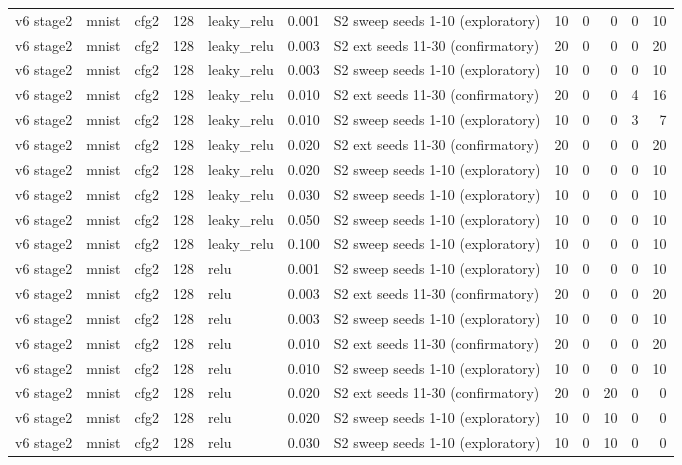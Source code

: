 \begin{table}[htbp]
{\begin{tabular}{@{}lllrlrlrrrrr@{}}
v6 stage2 & mnist & cfg2 & 128 & leaky\_relu & 0.001 & S2 sweep seeds 1-10 (exploratory) & 10 & 0 & 0 & 0 & 10 \\
v6 stage2 & mnist & cfg2 & 128 & leaky\_relu & 0.003 & S2 ext seeds 11-30 (confirmatory) & 20 & 0 & 0 & 0 & 20 \\
v6 stage2 & mnist & cfg2 & 128 & leaky\_relu & 0.003 & S2 sweep seeds 1-10 (exploratory) & 10 & 0 & 0 & 0 & 10 \\
v6 stage2 & mnist & cfg2 & 128 & leaky\_relu & 0.010 & S2 ext seeds 11-30 (confirmatory) & 20 & 0 & 0 & 4 & 16 \\
v6 stage2 & mnist & cfg2 & 128 & leaky\_relu & 0.010 & S2 sweep seeds 1-10 (exploratory) & 10 & 0 & 0 & 3 & 7 \\
v6 stage2 & mnist & cfg2 & 128 & leaky\_relu & 0.020 & S2 ext seeds 11-30 (confirmatory) & 20 & 0 & 0 & 0 & 20 \\
v6 stage2 & mnist & cfg2 & 128 & leaky\_relu & 0.020 & S2 sweep seeds 1-10 (exploratory) & 10 & 0 & 0 & 0 & 10 \\
v6 stage2 & mnist & cfg2 & 128 & leaky\_relu & 0.030 & S2 sweep seeds 1-10 (exploratory) & 10 & 0 & 0 & 0 & 10 \\
v6 stage2 & mnist & cfg2 & 128 & leaky\_relu & 0.050 & S2 sweep seeds 1-10 (exploratory) & 10 & 0 & 0 & 0 & 10 \\
v6 stage2 & mnist & cfg2 & 128 & leaky\_relu & 0.100 & S2 sweep seeds 1-10 (exploratory) & 10 & 0 & 0 & 0 & 10 \\
v6 stage2 & mnist & cfg2 & 128 & relu & 0.001 & S2 sweep seeds 1-10 (exploratory) & 10 & 0 & 0 & 0 & 10 \\
v6 stage2 & mnist & cfg2 & 128 & relu & 0.003 & S2 ext seeds 11-30 (confirmatory) & 20 & 0 & 0 & 0 & 20 \\
v6 stage2 & mnist & cfg2 & 128 & relu & 0.003 & S2 sweep seeds 1-10 (exploratory) & 10 & 0 & 0 & 0 & 10 \\
v6 stage2 & mnist & cfg2 & 128 & relu & 0.010 & S2 ext seeds 11-30 (confirmatory) & 20 & 0 & 0 & 0 & 20 \\
v6 stage2 & mnist & cfg2 & 128 & relu & 0.010 & S2 sweep seeds 1-10 (exploratory) & 10 & 0 & 0 & 0 & 10 \\
v6 stage2 & mnist & cfg2 & 128 & relu & 0.020 & S2 ext seeds 11-30 (confirmatory) & 20 & 0 & 20 & 0 & 0 \\
v6 stage2 & mnist & cfg2 & 128 & relu & 0.020 & S2 sweep seeds 1-10 (exploratory) & 10 & 0 & 10 & 0 & 0 \\
v6 stage2 & mnist & cfg2 & 128 & relu & 0.030 & S2 sweep seeds 1-10 (exploratory) & 10 & 0 & 10 & 0 & 0 \\

\end{tabular}}
\end{table}

